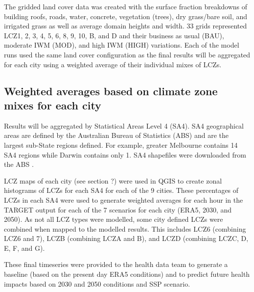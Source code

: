 \documentclass[final,3p,times,authoryear]{elsarticle}
\begin{document}
The gridded land cover data was created with the surface fraction breakdowns of building roofs, roads, water, concrete, vegetation (trees), dry grass/bare soil, and irrigated grass as well as average domain heights and width. 33 grids represented LCZ1, 2, 3, 4, 5, 6, 8, 9, 10, B, and D and their business as usual (BAU), moderate IWM (MOD), and high IWM (HIGH) variations. Each of the model runs used the same land cover configuration as the final results will be aggregated for each city using a weighted average of their individual mixes of LCZs.








\subsection{Weighted averages based on climate zone mixes for each city}\label{sec:methods_lczs}

Results will be aggregated by Statistical Areas Level 4 (SA4). SA4 geographical areas are defined by the Australian Bureau of Statistics (ABS) and are the largest sub-State regions defined. For example, greater Melbourne contains 14 SA4 regions while Darwin contains only 1. SA4 shapefiles were downloaded from the ABS \citep{ABS2021}. 

LCZ maps of each city (see section ?) were used in QGIS \citep{QGIS2009} to create zonal histograms of LCZs for each SA4 for each of the 9 cities. These percentages of LCZs in each SA4 were used to generate weighted averages for each hour in the TARGET output for each of the 7 scenarios for each city (ERA5, 2030, and 2050). As not all LCZ types were modelled, some city defined LCZs were combined when mapped to the modelled results. This includes LCZ6 (combining LCZ6 and 7), LCZB (combining LCZA and B), and LCZD (combining LCZC, D, E, F, and G).

These final timeseries were provided to the health data team to generate a baseline (based on the present day ERA5 conditions) and to predict future health impacts based on 2030 and 2050 conditions and SSP scenario. 
\end{document}
